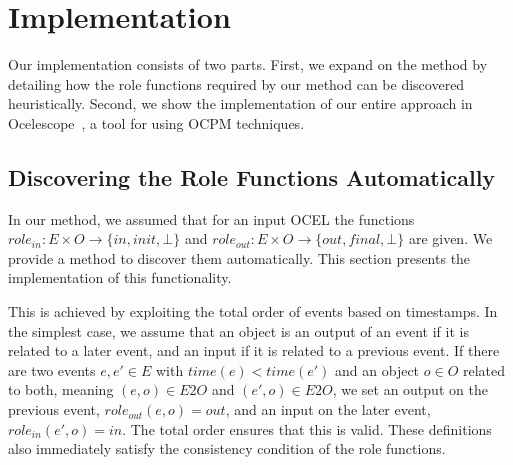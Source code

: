 \chapter{Implementation}
\label{chap:impl}

Our implementation consists of two parts.
First, we expand on the method by detailing how the role functions required by our method can be discovered heuristically.
Second, we show the implementation of our entire approach in Ocelescope~\autocite{ocelescope}, a tool for using OCPM techniques.




\section{Discovering the Role Functions Automatically}
\label{chap:finding-initial-final}



In our method, we assumed that for an input OCEL the functions $role_{in}: E \times O \rightarrow \{in, init, \bot\}$ and $role_{out}: E \times O \rightarrow \{out, final, \bot\}$ are given.
We provide a method to discover them automatically.
This section presents the implementation of this functionality.



This is achieved by exploiting the total order of events based on timestamps.
In the simplest case, we assume that an object is an output of an event if it is related to a later event, and an input if it is related to a previous event.
If there are two events $e, e' \in E$ with $time(e) < time(e')$ and an object $o \in O$ related to both, meaning $(e, o) \in E2O$ and $(e', o) \in E2O$, we set an output on the previous event, $role_{out}(e, o) = out$, and an input on the later event, $role_{in}(e', o) = in$.
The total order ensures that this is valid.
These definitions also immediately satisfy the consistency condition of the role functions.



